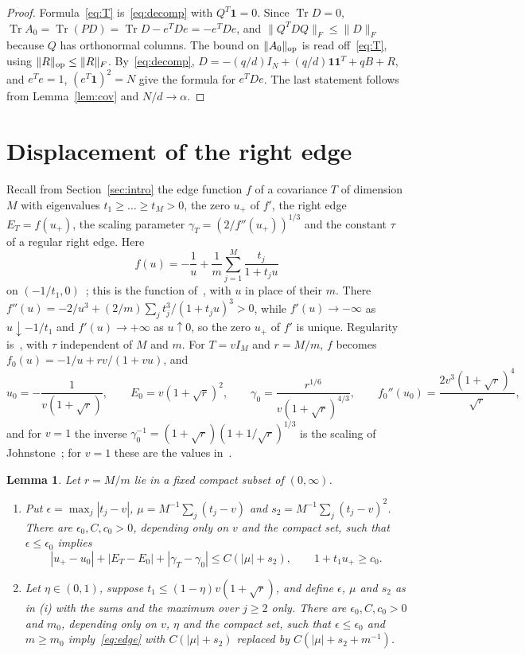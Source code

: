 \documentclass[11pt]{amsart}
\newtheorem{lemma}[theorem]{Lemma}
\theoremstyle{remark}
\numberwithin{equation}{section}
\DeclareMathOperator{\Tr}{Tr}
\begin{document}
\begin{proof}
Formula~\eqref{eq:T} is~\eqref{eq:decomp} with $Q^{T}\mathbf 1=0$. Since $\Tr D=0$, $\Tr A_0=\Tr(PD)=\Tr D-e^{T}De=-e^{T}De$, and $\|Q^{T}DQ\|_F\le\|D\|_F$ because $Q$ has orthonormal columns. The bound on $\|A_0\|_{\rm op}$ is read off~\eqref{eq:T}, using $\|R\|_{\rm op}\le\|R\|_F$. By~\eqref{eq:decomp}, $D=-(q/d)I_N+(q/d)\mathbf 1\mathbf 1^{T}+qB+R$, and $e^{T}e=1$, $(e^{T}\mathbf 1)^2=N$ give the formula for $e^{T}De$. The last statement follows from Lemma~\ref{lem:cov} and $N/d\to\alpha$.
\end{proof}

\section{Displacement of the right edge}\label{sec:edge}
Recall from Section~\ref{sec:intro} the edge function $f$ of a covariance $T$ of dimension $M$ with eigenvalues $t_1\ge\dots\ge t_M>0$, the zero $u_+$ of $f'$, the right edge $E_T=f(u_+)$, the scaling parameter $\gamma_T=(2/f''(u_+))^{1/3}$ and the constant $\tau$ of a regular right edge. Here
\[
f(u)=-\frac1u+\frac1m\sum_{j=1}^{M}\frac{t_j}{1+t_ju}
\]
on $(-1/t_1,0)$~\cite{SC,ElKaroui,LS}; this is the function of~\cite[(1.5)]{CL}, with $u$ in place of their $m$. There $f''(u)=-2/u^3+(2/m)\sum_jt_j^3/(1+t_ju)^3>0$, while $f'(u)\to-\infty$ as $u\downarrow-1/t_1$ and $f'(u)\to+\infty$ as $u\uparrow0$, so the zero $u_+$ of $f'$ is unique. Regularity is~\cite[Assumption~1.2]{CL}, with $\tau$ independent of $M$ and $m$. For $T=vI_M$ and $r=M/m$, $f$ becomes $f_0(u)=-1/u+rv/(1+vu)$, and
\[
u_0=-\frac1{v(1+\sqrt r)},\qquad E_0=v(1+\sqrt r)^2,\qquad\gamma_0=\frac{r^{1/6}}{v(1+\sqrt r)^{4/3}},\qquad f_0''(u_0)=\frac{2v^3(1+\sqrt r)^4}{\sqrt r},
\]
and for $v=1$ the inverse $\gamma_0^{-1}=(1+\sqrt r)(1+1/\sqrt r)^{1/3}$ is the scaling of Johnstone~\cite{Johnstone}; for $v=1$ these are the values in~\cite[Remark~1.5]{CL}.

\begin{lemma}\label{lem:edge}
Let $r=M/m$ lie in a fixed compact subset of $(0,\infty)$.
\begin{enumerate}
\item[(i)] Put $\epsilon=\max_j|t_j-v|$, $\mu=M^{-1}\sum_j(t_j-v)$ and $s_2=M^{-1}\sum_j(t_j-v)^2$. There are $\epsilon_0,C,c_0>0$, depending only on $v$ and the compact set, such that $\epsilon\le\epsilon_0$ implies
\begin{equation}\label{eq:edge}
|u_+-u_0|+|E_T-E_0|+|\gamma_T-\gamma_0|\le C(|\mu|+s_2),\qquad1+t_1u_+\ge c_0.
\end{equation}
\item[(ii)] Let $\eta\in(0,1)$, suppose $t_1\le(1-\eta)v(1+\sqrt r)$, and define $\epsilon$, $\mu$ and $s_2$ as in (i) with the sums and the maximum over $j\ge2$ only. There are $\epsilon_0,C,c_0>0$ and $m_0$, depending only on $v$, $\eta$ and the compact set, such that $\epsilon\le\epsilon_0$ and $m\ge m_0$ imply~\eqref{eq:edge} with $C(|\mu|+s_2)$ replaced by $C(|\mu|+s_2+m^{-1})$.
\end{enumerate}
\end{lemma}
\end{document}
